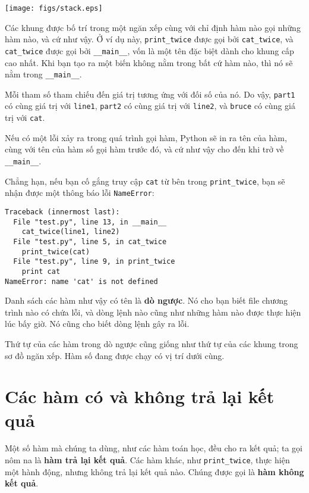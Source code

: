 \documentclass[11pt]{book}
\begin{document}
\beforefig
\centerline{\texttt{[image: figs/stack.eps]}}
\afterfig

Các khung được bố trí trong một ngăn xếp cùng với chỉ định hàm 
nào gọi những hàm nào, và cứ như vậy. Ở ví dụ này, \verb"print_twice"
được gọi bởi \verb"cat_twice", và \verb"cat_twice" được gọi bởi
\verb"__main__", vốn là một tên đặc biệt dành cho khung cấp cao nhất.
Khi bạn tạo ra một biến không nằm trong bất cứ hàm nào, thì
nó sẽ nằm trong \verb"__main__".

Mỗi tham số tham chiếu đến giá trị tương ứng với đối số của nó.
Do vậy, {\tt part1} có cùng giá trị với {\tt line1}, 
{\tt part2} có cùng giá trị với {\tt line2}, và
{\tt bruce} có cùng giá trị với {\tt cat}.

Nếu có một lỗi xảy ra trong quá trình gọi hàm, Python sẽ in ra
tên của hàm, cùng với tên của hàm số gọi hàm trước đó, và cứ 
như vậy cho đến khi trở về  \verb"__main__".

Chẳng hạn, nếu bạn cố gắng truy cập {\tt cat} từ bên trong
\verb"print_twice", bạn sẽ nhận được một thông báo lỗi {\tt NameError}:

\beforeverb
\begin{verbatim}
Traceback (innermost last):
  File "test.py", line 13, in __main__
    cat_twice(line1, line2)
  File "test.py", line 5, in cat_twice
    print_twice(cat)
  File "test.py", line 9, in print_twice
    print cat
NameError: name 'cat' is not defined
\end{verbatim}
\afterverb
%
Danh sách các hàm như vậy có tên là {\bf dò ngược}. Nó cho bạn biết
file chương trình nào có chứa lỗi, và dòng lệnh nào cũng như những
hàm nào được thực hiện lúc bấy giờ. Nó cũng cho biết dòng lệnh gây
ra lỗi.


Thứ tự của các hàm trong dò ngược cũng giống như thứ tự của các
khung trong sơ đồ ngăn xếp. Hàm số đang được chạy có vị trí 
dưới cùng.


\section{Các hàm có và không trả lại kết quả}


Một số hàm mà chúng ta dùng, như các hàm toán học, đều cho ra kết quả;
ta gọi nôm na là {\bf hàm trả lại kết quả}. Các hàm khác, như  \verb"print_twice", thực hiện một hành động, nhưng không trả lại
kết quả nào. Chúng được gọi là {\bf hàm không kết quả}.
\end{document}
